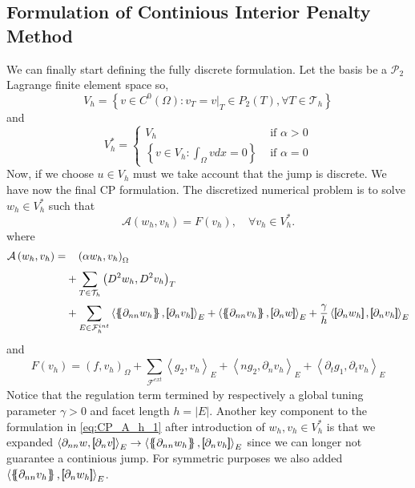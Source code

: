 \subsection{Formulation of Continious Interior Penalty Method}%
\label{sub:formulation_of_continious_interior_penalty_method}


We can finally start defining the fully discrete formulation. Let the basis be a $\mathcal{P}_{2} $ Lagrange finite element space so,
\[
V_{h} = \left\{ v \in C^{0}\left( \Omega  \right): v_{T} = v | _{T} \in P_{2}\left( T \right), \forall T \in
\mathcal{T}_{h}    \right\}
\]
and
\[
V_{h}^{*} = \begin{cases}
    V_{h} & \text{ if } \alpha  > 0 \\
    \left\{ v \in V_{h}: \int_{\Omega }^{} v dx   = 0   \right\} &  \text{ if } \alpha   = 0
\end{cases}
\]
Now, if we choose $u \in V_{h}$ must we take account that the jump is discrete.
 We have now the final CP formulation.
The discretized numerical problem is to solve $w_{h} \in V_{h}^{*}$ such that
\begin{equation}
\label{eq:CP_A_F}
\mathcal{A}\left( w_{h}, v_{h} \right)   = F\left( v_{h} \right), \quad \forall v_{h} \in V_{h}^{*}  .
\end{equation}
where
\begin{equation}
\label{eq:CP_A_h_1}
\begin{split}
\mathcal{A} \left( w_{h}, v_{h} \right)   =&
  \quad  \left( \alpha  w_{h}, v_{h} \right) _{\Omega }\\
&  + \sum_{T \in \mathcal{T} _{h}}^{} \left( D^2 w_{h}, D^2v_{h} \right) _{T} \\
 & +
  \sum_{E \in \mathcal{F}_{h}^{int} }^{}
  \left< \mean{  \partial _{n n} w_{h} }, \jump{ \partial _{n }v_{h}} \right>_{E}  +
 \left< \mean{ \partial _{n n} v_{h} }, \jump{ \partial _{n}w }      \right>_{E}
+ \frac{\gamma}{h}  \left< \jump{ \partial _{n} w_{h}}, \jump{ \partial _{n} v_{h}   }   \right>_{E}
\end{split}
\end{equation}
and
\begin{equation}
\label{eq:CP_F_h}
F\left( v_{h} \right)  = \left( f, v_{h} \right) _{\Omega } +  \sum_ {\mathcal{F} ^{ext}_{}}^{} \left<g_{2 }, v_{h}  \right> _{E}
+ \left<n g_{2}, \partial  _{n}v_{h} \right>_{E} + \left<\partial _{t} g_{1} , \partial _{t}v_{h} \right>_{E}
\end{equation}
Notice that the regulation term termined by respectively a global tuning parameter $\gamma >0 $ and facet length $h = \left\lvert E \right\rvert $. Another key component to the formulation
in \eqref{eq:CP_A_h_1} after introduction of $ w_{h}, v_{h} \in V^{*}_{h}$  is that we expanded $\left< \partial _{nn}w, \jump{ \partial _{n} v }  \right>_{E} \to \left< \mean{ \partial _{nn}w_{h} }  , \jump{ \partial _{n} v_{h} }  \right>_{E} $ since we can longer not guarantee a
continious jump. For symmetric purposes we also added $ \left< \mean{ \partial _{nn} v_{h}}  , \jump{ \partial _{n} w_{h} }  \right>_{E} $.

